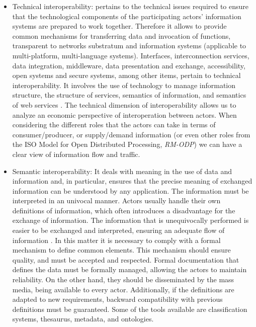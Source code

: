 \documentclass[10pt,twocolumn,ieeetran]{article}
\begin{document}
\begin{itemize}

\item Technical interoperability: pertains to the technical issues required to ensure that the technological components of the participating actors' information systems  are prepared to work together. Therefore  it allows to provide common mechanisms for transferring data and invocation of functions, transparent to networks substratum and information systems (applicable to multi-platform, multi-language systems). Interfaces, interconnection services, data integration, middleware, data presentation and exchange, accessibility, open systems and secure systems, among other items,   pertain to technical interoperability. It involves the use of technology to manage information structure, the structure of services, semantics of information, and semantics of web services \cite{Moreno}. The technical dimension of interoperability allows us to analyze an economic perspective of  interoperation between actors. When considering the different roles that the actors can take in terms of consumer/producer, or supply/demand information (or even other roles from the ISO Model for Open Distributed Processing, {\it RM-ODP}) we can have a clear view of  information flow and traffic.

\item Semantic interoperability: It deals with meaning in the use of data and information and, in particular, ensures that the precise meaning of exchanged information can be understood by any application. The information must be interpreted in an univocal manner. Actors usually handle their own definitions of information, which often introduces a disadvantage for the exchange of information. The information that is unequivocally performed is easier to be exchanged and interpreted, ensuring an adequate flow of information \cite{Moreno}.
In this matter it is necessary to comply with a formal mechanism to define common elements. This mechanism should ensure quality, and must be accepted and respected. Formal documentation that defines the data  must  be formally managed, allowing  the actors to maintain reliability.  On the other hand, they should be disseminated by the mass media, being  available to every actor. Additionally, if the definitions are adapted to new requirements,  backward compatibility  with previous definitions   must be  guaranteed. Some of the tools available are classification systems, thesaurus, metadata, and ontologies. 


\end{itemize}
\end{document}
